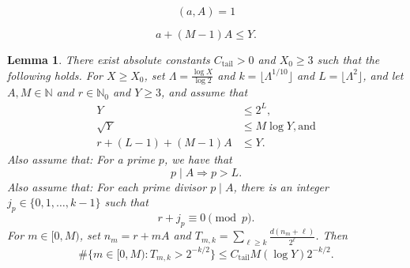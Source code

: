 \documentclass[10pt,a4paper]{amsart}
\newtheorem{lemma}{Lemma}
\begin{document}
\begin{equation} 
 (a, A) = 1 
\end{equation}

\begin{equation} 
 a + (M - 1) A \leq Y. 
\end{equation}

\begin{lemma}\label{taillemma}
 There exist absolute constants $C_{\operatorname{tail}} > 0$ and $X_0 \geq 3$ such that the following holds. For $X \geq X_0$, set 
 $\Lambda = \frac{\log X}{\log 2}$ and $k = \lfloor \Lambda^{1/10} \rfloor$
 and $L = \lfloor \Lambda^2 \rfloor$, and let $A, M \in \mathbb{N}$ and 	 $r \in \mathbb{N}_{0}$ and $Y \geq 3$, 
 and assume that 
\begin{align}
 Y & \leq 2^{L}, \label{Yleq2L} \\ 
 \sqrt{Y} & \leq M \log Y, \text{and} \label{sqrtYMlogY} \\ 
 r + (L-1) + (M-1) A & \leq Y. \label{longestassumption} 
\end{align}
 Also assume that: For a prime $p$, we have that 
\begin{equation}\label{ifpmidA}
 p \mid A \Longrightarrow p > L. 
\end{equation}
 Also assume that: For each prime divisor $p \mid A$, there is an integer $ j_p \in \{ 0, 1, \ldots, k-1 \} $ such that 
\begin{equation}\label{jpcongruence} 
 r + j_p \equiv 0 \pmod p. 
\end{equation}
 For 	 $m \in [0, M)$, set $ n_{m} = r + m A $ and $ T_{m, k} = \sum_{\ell \geq k} \frac{d(n_m + \ell)}{2^\ell}$. Then $$ \#\Big\{ m \in [0, 
 M) : T_{m, k} > 2^{-k/2} \Big\} \leq C_{\operatorname{tail}} M (\log Y) 2^{-k/2}.$$
\end{lemma}
\end{document}
